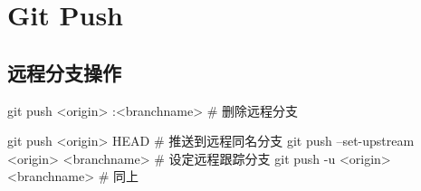 \chapter{Git Push}
\section{远程分支操作}
\begin{shellcmd}
git push <origin> :<branchname> # 删除远程分支

git push <origin> HEAD # 推送到远程同名分支
git push --set-upstream <origin> <branchname> # 设定远程跟踪分支
git push -u <origin> <branchname> # 同上
\end{shellcmd}
